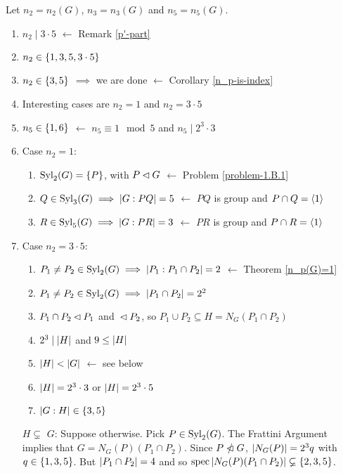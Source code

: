\begin{solution} Let $n_2=n_2(G)$, $n_3=n_3(G)$ and $n_5=n_5(G)$. 
\begin{enumerate}[1.]
    \item $n_2\mid3\cdot5$ $\leftarrow$ Remark \ref{p'-part}
    \item $n_2\in\{1, 3, 5, 3\cdot5\}$
    \item $n_2\in\{3,5\}$ $\implies$ we are done
        $\leftarrow$ Corollary \ref{n_p-is-index}
    \item Interesting cases are $n_2=1$ and $n_2=3\cdot5$
    \item $n_5\in\{1, 6\}$ $\leftarrow$ $n_5\equiv1\mod 5$ and $n_5\mid 2^3\cdot 3$
    \item Case $n_2=1$:
    \begin{enumerate}[\rm -]
        \item ${\rm Syl}_2(G)=\{P\}$, with $P\lhd G$
            $\leftarrow$ Problem \ref{problem-1.B.1}
        \item $Q\in{\rm Syl}_3(G)\implies\left\vert{G:PQ}\right\vert=5$
            $\leftarrow$ $PQ$ is group and $P\cap Q=\langle1\rangle$
        \item $R\in{\rm Syl}_5(G)\implies\left\vert{G:PR}\right\vert=3$
            $\leftarrow$ $PR$ is group and $P\cap R=\langle1\rangle$
    \end{enumerate}
    \item Case $n_2=3\cdot5$:
        \begin{enumerate}[\rm -]
            \item $P_1\ne P_2\in{\rm Syl}_2(G)\implies\left\vert{P_1:P_1\cap P_2}\right\vert= 2$
                $\leftarrow$ Theorem \ref{n_p(G)=1}
            \item $P_1\ne P_2\in{\rm Syl}_2(G)\implies\left\vert{P_1\cap P_2}\right\vert= 2^2$
            \item $P_1\cap P_2\lhd P_1$ and ${}\lhd P_2$,
                so $P_1\cup P_2\subseteq H=N_G(P_1\cap P_2)$
            \item  $2^3\mid\left\vert{H}\right\vert$ and $9\le\left\vert{H}\right\vert$
            \item $\left\vert{H}\right\vert<\left\vert{G}\right\vert$ $\leftarrow$ see below
            \item $\left\vert{H}\right\vert=2^3\cdot3$ or $\left\vert{H}\right\vert=2^3\cdot5$
            \item $\left\vert{G:H}\right\vert\in\{3,5\}$
        \end{enumerate}
\end{enumerate}

\begin{enumerate}
    \item[$H\varsubsetneq$] $G$: Suppose otherwise. Pick $P\in{\rm Syl}_2(G)$. The Frattini Argument implies that $G=N_G(P)(P_1\cap P_2)$. Since $P\nnormal G$, $\left\vert{N_G(P)}\right\vert=2^3q$ with $q\in\{1,3,5\}$. But $\left\vert{P_1\cap P_2}\right\vert=4$ and so $\operatorname{spec}\left\vert{N_G(P)(P_1\cap P_2)}\right\vert\varsubsetneq\{2,3,5\}$.
\end{enumerate}
\end{solution}

